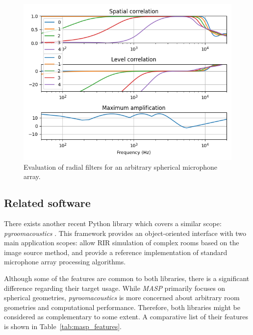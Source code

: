 \begin{figure}[h!]
\label{fig_architecture}
  \centering
    \includegraphics[width=1\textwidth]{Figures/DataGeneration/sht_filters.png}
    \caption{Evaluation of radial filters for an arbitrary spherical microphone array.}
    \label{fig:sht_filters}
\end{figure}

\subsection{Related software}

There exists another recent Python library which covers a similar scope: \textit{pyroomacoustics} \cite{scheibler2018pyroomacoustics}.
This framework provides an object-oriented interface with two main application scopes: allow RIR simulation of complex rooms based on the image source method, and provide a reference implementation of standard microphone array processing algorithms. 

Although some of the features are common to both libraries, there is a significant difference regarding their target usage. While \textit{MASP} primarily focuses on spherical geometries, \textit{pyroomacoustics} is more concerned about arbitrary room geometries and computational performance. 
Therefore, both libraries might be considered as complementary to some extent. 
A comparative list of their features is shown in Table~\ref{tab:masp_features}.



